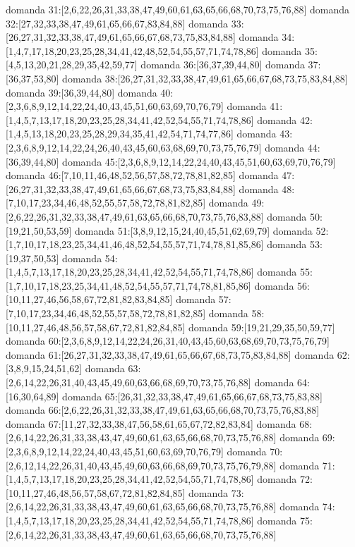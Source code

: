 domanda 31:[2,6,22,26,31,33,38,47,49,60,61,63,65,66,68,70,73,75,76,88]
domanda 32:[27,32,33,38,47,49,61,65,66,67,83,84,88]
domanda 33:[26,27,31,32,33,38,47,49,61,65,66,67,68,73,75,83,84,88]
domanda 34:[1,4,7,17,18,20,23,25,28,34,41,42,48,52,54,55,57,71,74,78,86]
domanda 35:[4,5,13,20,21,28,29,35,42,59,77]
domanda 36:[36,37,39,44,80]
domanda 37:[36,37,53,80]
domanda 38:[26,27,31,32,33,38,47,49,61,65,66,67,68,73,75,83,84,88]
domanda 39:[36,39,44,80]
domanda 40:[2,3,6,8,9,12,14,22,24,40,43,45,51,60,63,69,70,76,79]
domanda 41:[1,4,5,7,13,17,18,20,23,25,28,34,41,42,52,54,55,71,74,78,86]
domanda 42:[1,4,5,13,18,20,23,25,28,29,34,35,41,42,54,71,74,77,86]
domanda 43:[2,3,6,8,9,12,14,22,24,26,40,43,45,60,63,68,69,70,73,75,76,79]
domanda 44:[36,39,44,80]
domanda 45:[2,3,6,8,9,12,14,22,24,40,43,45,51,60,63,69,70,76,79]
domanda 46:[7,10,11,46,48,52,56,57,58,72,78,81,82,85]
domanda 47:[26,27,31,32,33,38,47,49,61,65,66,67,68,73,75,83,84,88]
domanda 48:[7,10,17,23,34,46,48,52,55,57,58,72,78,81,82,85]
domanda 49:[2,6,22,26,31,32,33,38,47,49,61,63,65,66,68,70,73,75,76,83,88]
domanda 50:[19,21,50,53,59]
domanda 51:[3,8,9,12,15,24,40,45,51,62,69,79]
domanda 52:[1,7,10,17,18,23,25,34,41,46,48,52,54,55,57,71,74,78,81,85,86]
domanda 53:[19,37,50,53]
domanda 54:[1,4,5,7,13,17,18,20,23,25,28,34,41,42,52,54,55,71,74,78,86]
domanda 55:[1,7,10,17,18,23,25,34,41,48,52,54,55,57,71,74,78,81,85,86]
domanda 56:[10,11,27,46,56,58,67,72,81,82,83,84,85]
domanda 57:[7,10,17,23,34,46,48,52,55,57,58,72,78,81,82,85]
domanda 58:[10,11,27,46,48,56,57,58,67,72,81,82,84,85]
domanda 59:[19,21,29,35,50,59,77]
domanda 60:[2,3,6,8,9,12,14,22,24,26,31,40,43,45,60,63,68,69,70,73,75,76,79]
domanda 61:[26,27,31,32,33,38,47,49,61,65,66,67,68,73,75,83,84,88]
domanda 62:[3,8,9,15,24,51,62]
domanda 63:[2,6,14,22,26,31,40,43,45,49,60,63,66,68,69,70,73,75,76,88]
domanda 64:[16,30,64,89]
domanda 65:[26,31,32,33,38,47,49,61,65,66,67,68,73,75,83,88]
domanda 66:[2,6,22,26,31,32,33,38,47,49,61,63,65,66,68,70,73,75,76,83,88]
domanda 67:[11,27,32,33,38,47,56,58,61,65,67,72,82,83,84]
domanda 68:[2,6,14,22,26,31,33,38,43,47,49,60,61,63,65,66,68,70,73,75,76,88]
domanda 69:[2,3,6,8,9,12,14,22,24,40,43,45,51,60,63,69,70,76,79]
domanda 70:[2,6,12,14,22,26,31,40,43,45,49,60,63,66,68,69,70,73,75,76,79,88]
domanda 71:[1,4,5,7,13,17,18,20,23,25,28,34,41,42,52,54,55,71,74,78,86]
domanda 72:[10,11,27,46,48,56,57,58,67,72,81,82,84,85]
domanda 73:[2,6,14,22,26,31,33,38,43,47,49,60,61,63,65,66,68,70,73,75,76,88]
domanda 74:[1,4,5,7,13,17,18,20,23,25,28,34,41,42,52,54,55,71,74,78,86]
domanda 75:[2,6,14,22,26,31,33,38,43,47,49,60,61,63,65,66,68,70,73,75,76,88]
